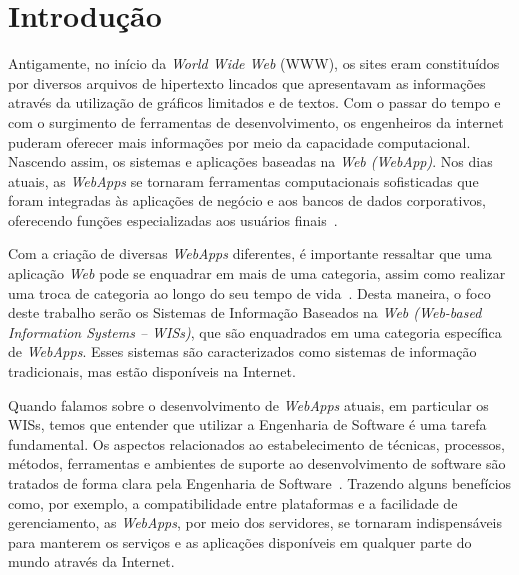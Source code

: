 \chapter{Introdução}
\label{sec-intro}

Antigamente, no início da \textit{World Wide Web} (WWW), os sites eram constituídos por diversos arquivos de hipertexto lincados que apresentavam as informações através da utilização de gráficos limitados e de textos. Com o passar do tempo e com o surgimento de ferramentas de desenvolvimento, os engenheiros da internet puderam oferecer mais informações por meio da capacidade computacional. Nascendo assim, os sistemas e aplicações baseadas na \textit{Web (WebApp)}. Nos dias atuais, as \textit{WebApps} se tornaram ferramentas computacionais sofisticadas que foram integradas às aplicações de negócio e aos bancos de dados corporativos, oferecendo funções especializadas aos usuários finais~\cite{pressman:es11}.    

Com a criação de diversas \textit{WebApps} diferentes, é importante ressaltar que uma aplicação \textit{Web} pode se enquadrar em mais de uma categoria, assim como realizar uma troca de categoria ao longo do seu tempo de vida~\cite{beder:ew12}. Desta maneira, o foco deste trabalho serão os Sistemas de Informação Baseados na \textit{Web (Web-based Information Systems – WISs)}, que são enquadrados em uma categoria específica de \textit{WebApps}. Esses sistemas são caracterizados como sistemas de informação tradicionais, mas estão disponíveis na Internet.

Quando falamos sobre o desenvolvimento de \textit{WebApps} atuais, em particular os WISs, temos que entender que utilizar a Engenharia de Software é uma tarefa fundamental. Os aspectos relacionados ao estabelecimento de técnicas, processos, métodos, ferramentas e ambientes de suporte ao desenvolvimento de software são tratados de forma clara pela Engenharia de Software~\cite{falbo:es14}. Trazendo alguns benefícios como, por exemplo, a compatibilidade entre plataformas e a facilidade de gerenciamento, as \textit{WebApps}, por meio dos servidores, se tornaram indispensáveis para manterem os serviços e as aplicações disponíveis em qualquer parte do mundo através da Internet.

